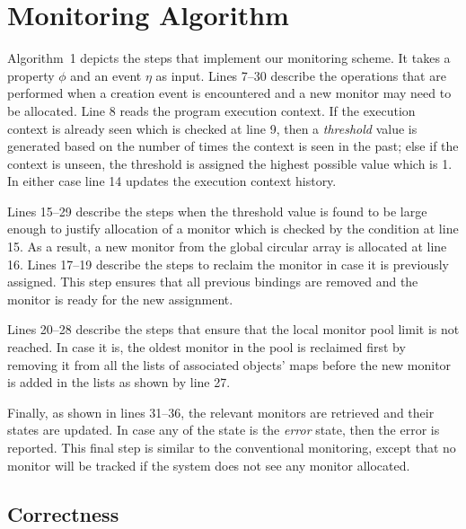 \section{Monitoring Algorithm}
\label{sec:algo}

Algorithm~1 depicts the steps that implement our monitoring scheme. It takes a
property $\phi$ and an event $\eta$ as input. Lines 7--30 
describe the operations that are performed when a creation event is encountered 
and a new monitor may need to be allocated. Line 8 reads the program execution 
context. If the execution context is already seen which is checked at line 9, 
then a \textit{threshold} value is generated based on the number of times the 
context is seen in the past; else if the context is unseen, the threshold is 
assigned the highest possible value which is 1. In either case line 14 updates 
the execution context history.

Lines 15--29 describe the steps when the threshold value is found to be large 
enough to justify allocation of a monitor which is checked by the condition at 
line 15. As a result, a new monitor from the global circular array is allocated
at line 16. Lines 17--19 describe the steps to reclaim the monitor in case it is previously 
assigned. This step ensures that all previous bindings are removed and the 
monitor is ready for the new assignment.

Lines 20--28 describe the steps that ensure that the local monitor pool limit is 
not reached. In case it is, the oldest monitor in the pool is reclaimed first by 
removing it from all the lists of associated objects' maps before the new monitor 
is added in the lists as shown by line 27.

Finally, as shown in lines 31--36, the relevant monitors are retrieved and their 
states are updated. In case any of the state is the \textit{error} state, then 
the error is reported. This final step is similar to the conventional 
monitoring, except that no monitor will be tracked if the system does not see 
any monitor allocated.

\subsection{Correctness}
\label{subsec:correctness}

